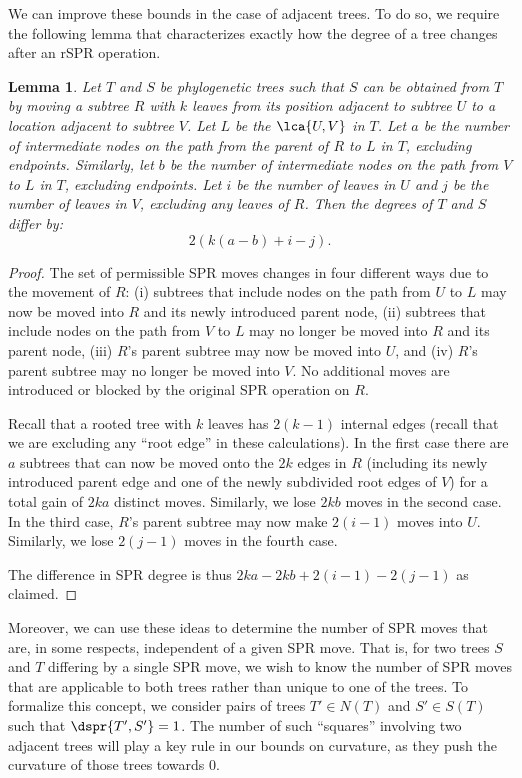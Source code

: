 \documentclass[11pt,onecolumn,conference]{IEEEtran}
\newtheorem{lemma}[theorem]{Lemma}
\begin{document}
We can improve these bounds in the case of adjacent trees.
To do so, we require the following lemma that characterizes exactly how the degree of a tree changes after an rSPR operation.

\begin{lemma}
\label{lem:degree_change}
Let $T$ and $S$ be phylogenetic trees such that $S$ can be obtained from $T$ by moving a subtree $R$ with $k$ leaves from its position adjacent to subtree $U$ to a location adjacent to subtree $V$.
Let $L$ be the $\lca{U,V}$ in $T$.
Let $a$ be the number of intermediate nodes on the path from the parent of $R$ to $L$ in $T$, excluding endpoints.
Similarly, let $b$ be the number of intermediate nodes on the path from $V$ to $L$ in $T$, excluding endpoints.
Let $i$ be the number of leaves in $U$ and $j$ be the number of leaves in $V$, excluding any leaves of $R$.
Then the degrees of $T$ and $S$ differ by:
$$2\left(k(a-b) + i - j\right).$$

\end{lemma}
\begin{proof}
The set of permissible SPR moves changes in four different ways due to the movement of $R$:
(i) subtrees that include nodes on the path from $U$ to $L$ may now be moved into $R$ and its newly introduced parent node,
(ii) subtrees that include nodes on the path from $V$ to $L$ may no longer be moved into $R$ and its parent node,
(iii) $R$'s parent subtree may now be moved into $U$, and
(iv) $R$'s parent subtree may no longer be moved into $V$.
No additional moves are introduced or blocked by the original SPR operation on $R$.

Recall that a rooted tree with $k$ leaves has $2(k-1)$ internal edges (recall that we are excluding any ``root edge'' in these calculations).
In the first case there are $a$ subtrees that can now be moved onto the $2k$ edges in $R$ (including its newly introduced parent edge and one of the newly subdivided root edges of $V$) for a total gain of $2ka$ distinct moves.
Similarly, we lose $2kb$ moves in the second case.
In the third case, $R$'s parent subtree may now make $2(i-1)$ moves into $U$.
Similarly, we lose $2(j-1)$ moves in the fourth case.

The difference in SPR degree is thus $2ka - 2kb + 2(i-1) - 2(j-1)$ as claimed.
\end{proof}

Moreover, we can use these ideas to determine the number of SPR moves that are, in some respects, independent of a given SPR move.
That is, for two trees $S$ and $T$ differing by a single SPR move, we wish to know the number of SPR moves that are applicable to both trees rather than unique to one of the trees.
To formalize this concept, we consider pairs of trees $T' \in N(T)$ and $S' \in S(T)$ such that $\dspr{T',S'} = 1$.
The number of such ``squares'' involving two adjacent trees will play a key rule in our bounds on curvature, as they push the curvature of those trees towards 0.
\end{document}
